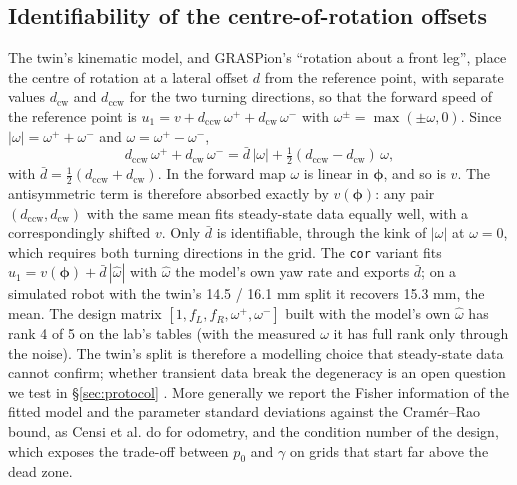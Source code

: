 \subsection{Identifiability of the centre-of-rotation
offsets}\label{sec:identifiability}

The twin's kinematic model, and GRASPion's ``rotation about a front
leg'', place the centre of rotation at a lateral offset \(d\) from the
reference point, with separate values \(d_\mathrm{cw}\) and
\(d_\mathrm{ccw}\) for the two turning directions, so that the forward
speed of the reference point is
\(u_1 = v + d_\mathrm{ccw}\,\omega^+ + d_\mathrm{cw}\,\omega^-\) with
\(\omega^\pm = \max(\pm\omega, 0)\). Since
\(|\omega| = \omega^+ + \omega^-\) and \(\omega = \omega^+ - \omega^-\),
\begin{equation}
d_\mathrm{ccw}\,\omega^+ + d_\mathrm{cw}\,\omega^- = \bar d\,|\omega| + \tfrac12 (d_\mathrm{ccw} - d_\mathrm{cw})\,\omega,
\label{eq:cor}
\end{equation}
with \(\bar d = \tfrac12 (d_\mathrm{ccw} + d_\mathrm{cw})\).
In the forward map \(\omega\) is linear in \(\boldsymbol\phi\), and so
is \(v\). The antisymmetric term is therefore absorbed exactly by
\(v(\boldsymbol\phi)\): any pair \((d_\mathrm{ccw}, d_\mathrm{cw})\)
with the same mean fits steady-state data equally well, with a
correspondingly shifted \(v\). Only \(\bar d\) is identifiable, through
the kink of \(|\omega|\) at \(\omega = 0\), which requires both turning
directions in the grid. The \texttt{cor} variant fits
\(u_1 = v(\boldsymbol\phi) + \bar d\,|\hat\omega|\) with \(\hat\omega\)
the model's own yaw rate and exports \(\bar d\); on a simulated robot
with the twin's 14.5 / 16.1 mm split it recovers 15.3 mm, the mean. The
design matrix \([1, f_L, f_R, \omega^+, \omega^-]\) built with the
model's own \(\hat\omega\) has rank 4 of 5 on the lab's tables (with
the measured \(\omega\) it has full rank only through the noise). The twin's split is therefore a modelling choice that
steady-state data cannot confirm; whether transient data break the
degeneracy is an open question we test in §\ref{sec:protocol} . More
generally we report the Fisher information of the fitted model and the
parameter standard deviations against the Cramér--Rao bound, as Censi et
al. \cite{censi2013calibration} do for odometry, and the condition
number of the design, which exposes the trade-off between \(p_0\) and
\(\gamma\) on grids that start far above the dead zone.

